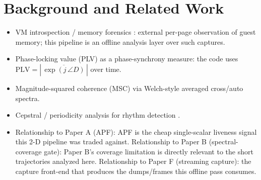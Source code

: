 \documentclass[conference]{IEEEtran}
\begin{document}
\section{Background and Related Work}
\begin{itemize}
  \item VM introspection / memory forensics \cite{garfinkel2003vmi}: external
        per-page observation of guest memory; this pipeline is an offline
        analysis layer over such captures.
  \item Phase-locking value (PLV) as a phase-synchrony measure: the code uses
        $\mathrm{PLV} = |\,\overline{\exp(j\,\angle D)}\,|$ over time.
        \cite{TODO_plv} %
  \item Magnitude-squared coherence (MSC) via Welch-style averaged
        cross/auto spectra.
        \cite{TODO_msc} %
  \item Cepstral / periodicity analysis for rhythm detection
        \cite{TODO_cepstrum}. %
  \item Relationship to Paper A (APF): APF is the cheap single-scalar liveness
        signal this 2-D pipeline was traded against. Relationship to Paper B
        (spectral-coverage gate): Paper B's coverage limitation is directly
        relevant to the short trajectories analyzed here. Relationship to
        Paper F (streaming capture): the capture front-end that produces the
        dumps/frames this offline pass consumes.
\end{itemize}

\end{document}
